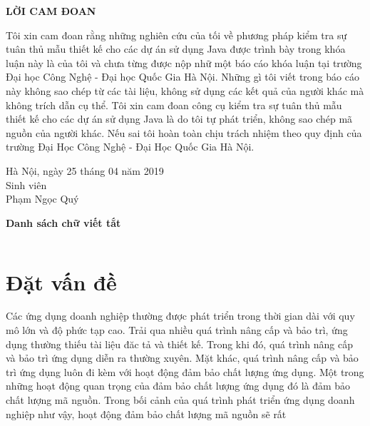 \documentclass[12pt]{report}
\begin{document}
\newpage
\begin{center}
	\textbf{\large LỜI CAM ĐOAN}
\end{center}
Tôi xin cam đoan rằng những nghiên cứu của tối về phương pháp kiểm tra sự tuân thủ mẫu thiết kế cho các dự án sử dụng Java được trình bày trong khóa luận này là của tôi và chưa từng được nộp nhữ một báo cáo khóa luận tại trường Đại học Công Nghệ - Đại học Quốc Gia Hà Nội. Những gì tôi viết trong báo cáo này không sao chép từ các tài liệu, không sử dụng các kết quả của người khác mà không trích dẫn cụ thể. Tôi xin cam đoan công cụ kiểm tra sự tuân thủ mẫu thiết kế cho các dự án sử dụng Java là do tôi tự phát triển, không sao chép mã nguồn của người khác. Nếu sai tôi hoàn toàn chịu trách nhiệm theo quy định của trường Đại Học Công Nghệ - Đại Học Quốc Gia Hà Nội.


\begin{flushright}
	\begin{varwidth}{\linewidth}\centering
		Hà Nội, ngày 25 tháng 04 năm 2019\\
		Sinh viên\\[2cm]
		Phạm Ngọc Quý
	\end{varwidth}
\end{flushright}

\newpage
\tableofcontents

\newpage
{}
\listoftables

\newpage
{}
\begin{flushleft}
\bfseries{\Huge{Danh sách chữ viết tắt}}
\end{flushleft}
\begin{table}[h]
	\centering
	\begin{tabular}{lll}
	
	\end{tabular}
\end{table}

\newpage
{}
\listoffigures

\newpage
{}
\setcounter{page}{1}
\chapter{Đặt vấn đề}
\label{chap:intro}
Các ứng dụng doanh nghiệp thường được phát triển trong thời gian dài với quy mô lớn và độ phức tạp cao. Trải qua nhiều quá trình nâng cấp và bảo trì, ứng dụng thường thiếu tài liệu đăc tả và thiết kế. Trong khi đó, quá trình nâng cấp và bảo trì ứng dụng diễn ra thường xuyên. Mặt khác, quá trình nâng cấp và bảo trì ứng dụng luôn đi kèm với hoạt động đảm bảo chất lượng ứng dụng. Một trong những hoạt động quan trọng của đảm bảo chất lượng ứng dụng đó là đảm bảo chất lượng mã nguồn.
Trong bối cảnh của quá trình phát triển ứng dụng doanh nghiệp như vậy, hoạt động đảm bảo chất lượng mã nguồn sẽ rất  
\end{document}
